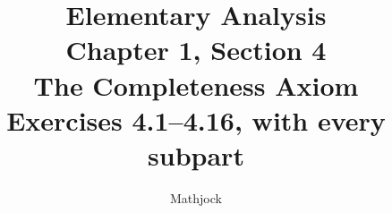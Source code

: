 
\title{\textbf{Elementary Analysis}\\[0.3em]
Chapter 1, Section 4\\[0.3em]
\large The Completeness Axiom\\
Exercises 4.1--4.16, with every subpart}
\author{Mathjock}
\date{}

\maketitle
\bookinfo
\tableofcontents
\clearpage
\setcounter{section}{3}


